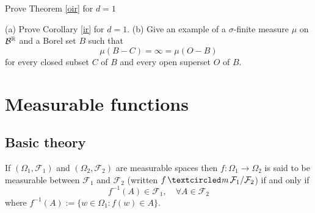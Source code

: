 \begin{exercise}
Prove Theorem \ref{oir} for $d=1$
\end{exercise}




\begin{exercise}
(a) Prove Corollary \ref{ir} for $d=1$.
(b)
Give an example of a $\sigma$-finite measure $\mu$ on $\mathcal B^{\Bbb R}$ and a Borel set $B$ such that
\[ \mu(B-C)= \infty = \mu(O-B) \]
for every closed subset $C$ of $B$ and every open superset $O$ of $B$.
\end{exercise}


\clearpage
\section{Measurable functions}

\subsection{Basic theory}

\begin{definition}
If $(\Omega_1, \mathcal F_1)$ and $(\Omega_2,\mathcal F_2)$ are measurable spaces then $f\colon \Omega_1 \rightarrow \Omega_2$ is said to be {measurable between $\mathcal F_1$ and $\mathcal F_2$} (written $f\mcirc \mathcal F_1/\mathcal F_2$) if and only if
\[ f^{-1}(A)\in \mathcal F_1,\quad\forall A\in\mathcal F_2\]
where $ f^{-1}(A):=\{w\in\Omega_1: f(w)\in A \}$.
\end{definition}


